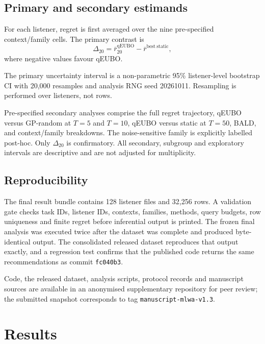 \documentclass[preprint,12pt]{elsarticle}
\begin{document}
\subsection{Primary and secondary estimands}

For each listener, regret is first averaged over the nine pre-specified context/family cells. The primary contrast is
\begin{equation}
 \Delta_{20}=\bar r^{\mathrm{qEUBO}}_{20}-\bar r^{\mathrm{best\ static}},
\end{equation}
where negative values favour qEUBO.

The primary uncertainty interval is a non-parametric 95\% listener-level bootstrap CI with 20,000 resamples and analysis RNG seed 20261011. Resampling is performed over listeners, not rows.

Pre-specified secondary analyses comprise the full regret trajectory, qEUBO versus GP-random at $T=5$ and $T=10$, qEUBO versus static at $T=50$, BALD, and context/family breakdowns. The noise-sensitive family is explicitly labelled post-hoc. Only $\Delta_{20}$ is confirmatory. All secondary, subgroup and exploratory intervals are descriptive and are not adjusted for multiplicity.

\subsection{Reproducibility}
\label{sec:repro}

The final result bundle contains 128 listener files and 32,256 rows. A validation gate checks task IDs, listener IDs, contexts, families, methods, query budgets, row uniqueness and finite regret before inferential output is printed. The frozen final analysis was executed twice after the dataset was complete and produced byte-identical output. The consolidated released dataset reproduces that output exactly, and a regression test confirms that the published code returns the same recommendations as commit \texttt{fc040b3}.

Code, the released dataset, analysis scripts, protocol records and manuscript sources are available in an anonymised supplementary repository for peer review; the submitted snapshot corresponds to tag \texttt{manuscript-mlwa-v1.3}.

\section{Results}
\label{sec:results}
\end{document}

